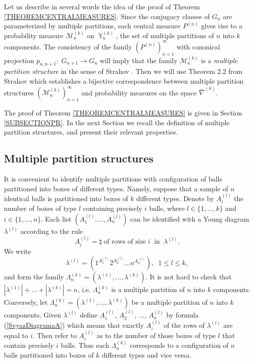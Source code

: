 \documentclass[12pt]{amsart}
\theoremstyle{definition}
\numberwithin{equation}{section}
\DeclareMathOperator{\Y}{\mathbb{Y}}
\begin{document}
Let us describe in several words the idea of the proof of Theorem \ref{THEOREMCENTRALMEASURES}.  Since the conjugacy classes of $G_n$ are parameterized by multiple partitions, each central measure $P^{(n)}$ gives rise to a probability measure $\mathcal{M}_n^{(k)}$ on $\Y_n^{(k)}$, the set of multiple partitions of $n$ into $k$ components. The consistency of the family $\left(P^{(n)}\right)_{n=1}^{\infty}$ with canonical projection $p_{n,n+1}:\; G_{n+1}\longrightarrow G_n$ will imply that the family $\mathcal{M}_n^{(k)}$ is a \textit{multiple partition structure} in the sense of Strahov \cite{StrahovMPS}. Then we will use  Theorem 2.2 from Strahov \cite{StrahovMPS} which establishes a bijective correspondence between multiple partition structures  $\left(\mathcal{M}_n^{(k)}\right)_{n=1}^{\infty}$ and probability measures on the space
$\overline{\nabla}^{(k)}$.

The  proof of Theorem \ref{THEOREMCENTRALMEASURES} is given in Section \ref{SUBSECTIONPR}. In the next Section we recall the definition of multiple partition structures, and present  their relevant properties.
\subsection{Multiple partition structures}\label{SubSectionMPS}
It is convenient to identify multiple partitions with configuration of balls partitioned into boxes of different types.  Namely, suppose that a sample of $n$ identical balls is partitioned into boxes of $k$ different types.
Denote by $A_i^{(l)}$ the number of boxes of type $l$
containing precisely $i$ balls, where  $l\in\{1,\ldots,k\}$ and $i\in\{1,\ldots,n\}$.
Each list $\left(A_1^{(l)},\ldots,A_n^{(l)}\right)$ can be identified with a Young diagram
$\lambda^{(l)}$ according to the rule
$$
A_i^{(l)}=\sharp\;\mbox{of rows of size}\;i\;\;\mbox{in}\;\; \lambda^{(l)}.
$$
We write
\begin{equation}\label{SvyazDiagramaA}
\lambda^{(l)}=\left(1^{A_1^{(l)}}2^{A_2^{(l)}}\ldots n^{A_n^{(l)}}\right),\;\; 1\leq l\leq k,
\end{equation}
and form the family $\Lambda_n^{(k)}=\left(\lambda^{(1)},\ldots,\lambda^{(k)}\right)$.
It is not hard to check that $|\lambda^{(1)}|+\ldots+|\lambda^{(k)}|=n$, i.e. $\Lambda_n^{(k)}$
is a multiple partition of $n$ into $k$ components. Conversely, let $\Lambda_n^{(k)}=\left(\lambda^{(1)},\ldots,\lambda^{(k)}\right)$
be a multiple partition of $n$ into $k$ components.  Given $\lambda^{(l)}$ define $A_1^{(l)}$, $A_2^{(l)}$, $\ldots$, $A_n^{(l)}$
by formula (\ref{SvyazDiagramaA}) which means that exactly $A_i^{(l)}$ of the rows of $\lambda^{(l)}$
are equal to $i$. Then refer to $A_i^{(l)}$ as to the number of those boxes of type $l$ that
contain precisely $i$ balls.
Thus each $\Lambda_n^{(k)}$ corresponds to a configuration of $n$ balls partitioned into boxes
of $k$ different types and vice versa.
\end{document}
